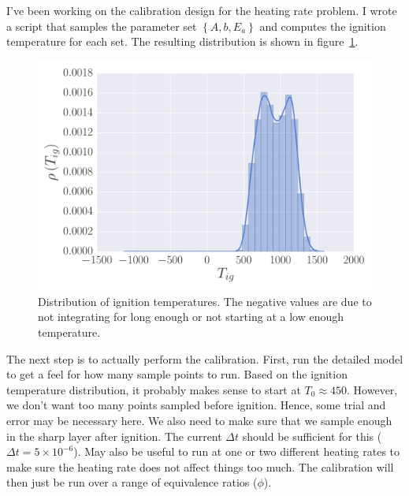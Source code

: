 I've been working on the calibration design for the heating rate problem.  I wrote a script that samples the parameter set $\left\{A, b, E_{a}\right\}$ and computes the ignition temperature for each set.  The resulting distribution is shown in figure~\ref{fig:Tig}.
\begin{figure}[h]
  \includegraphics[width=\textwidth]{figures/2016/April/Ignition_Temperature.pdf}
  \caption{Distribution of ignition temperatures.  The negative values are due to not integrating for long enough or not starting at a low enough temperature.}
  \label{fig:Tig}
\end{figure}
The next step is to actually perform the calibration.  First, run the detailed model to get a feel for how many sample points to run.  Based on the ignition temperature distribution, it probably makes sense to start at $T_{0}\approx 450$.  However, we don't want too many points sampled before ignition.  Hence, some trial and error may be necessary here.  We also need to make sure that we sample enough in the sharp layer after ignition.  The current $\Delta t$ should be sufficient for this ($\Delta t = 5\times 10^{-6}$).  May also be useful to run at one or two different heating rates to make sure the heating rate does not affect things too much.  The calibration will then just be run over a range of equivalence ratios ($\phi$).

